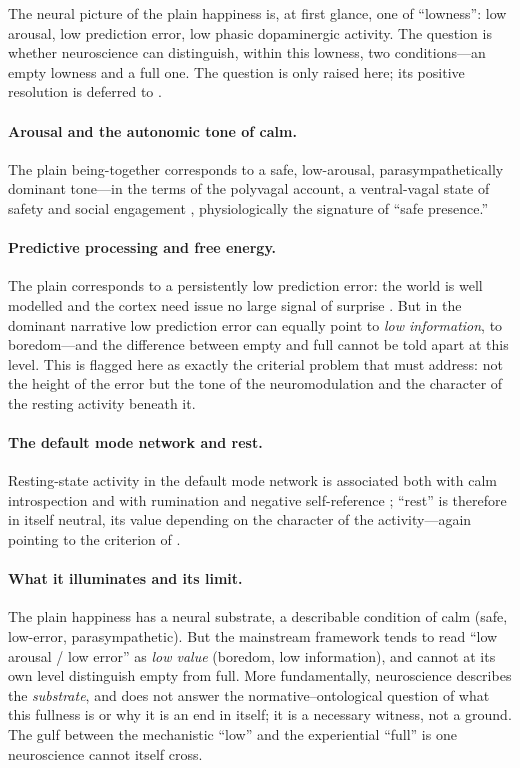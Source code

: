 The neural picture of the plain happiness is, at first glance, one of ``lowness'': low arousal, low prediction error, low phasic dopaminergic activity. The question is whether neuroscience can distinguish, within this lowness, two conditions---an empty lowness and a full one. The question is only raised here; its positive resolution is deferred to .

\paragraph{Arousal and the autonomic tone of calm.} The plain being-together corresponds to a safe, low-arousal, parasympathetically dominant tone---in the terms of the polyvagal account, a ventral-vagal state of safety and social engagement \parencite{porges2007}, physiologically the signature of ``safe presence.''

\paragraph{Predictive processing and free energy.} The plain corresponds to a persistently low prediction error: the world is well modelled and the cortex need issue no large signal of surprise \parencite{friston2010}. But in the dominant narrative low prediction error can equally point to \emph{low information}, to boredom---and the difference between empty and full cannot be told apart at this level. This is flagged here as exactly the criterial problem that  must address: not the height of the error but the tone of the neuromodulation and the character of the resting activity beneath it.

\paragraph{The default mode network and rest.} Resting-state activity in the default mode network is associated both with calm introspection and with rumination and negative self-reference \parencite{raichle2001}; ``rest'' is therefore in itself neutral, its value depending on the character of the activity---again pointing to the criterion of .

\paragraph{What it illuminates and its limit.} The plain happiness has a neural substrate, a describable condition of calm (safe, low-error, parasympathetic). But the mainstream framework tends to read ``low arousal / low error'' as \emph{low value} (boredom, low information), and cannot at its own level distinguish empty from full. More fundamentally, neuroscience describes the \emph{substrate}, and does not answer the normative--ontological question of what this fullness is or why it is an end in itself; it is a necessary witness, not a ground. The gulf between the mechanistic ``low'' and the experiential ``full'' is one neuroscience cannot itself cross.

